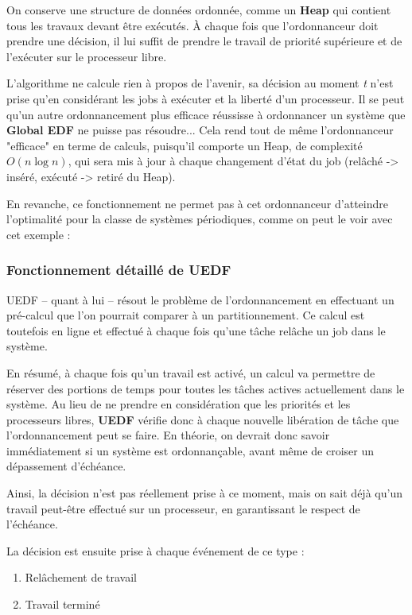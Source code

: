 		
		On conserve une structure de données 
		ordonnée, comme un \textbf{Heap}  qui contient tous les travaux
		devant être exécutés. À chaque fois que l'ordonnanceur doit prendre 
		une décision, il lui suffit de prendre le travail de priorité supérieure et 
		de l'exécuter sur le processeur libre.
		
		L'algorithme ne calcule rien à propos de l'avenir, sa décision au moment \textit{t}
		n'est prise qu'en considérant les jobs à exécuter et la liberté d'un 
		processeur. Il se peut qu'un autre ordonnancement plus efficace 
		réussisse à ordonnancer un système que \textbf{Global EDF} ne puisse pas résoudre...
		Cela rend tout de même l'ordonnanceur "efficace" en terme de calculs, 
		puisqu'il comporte un Heap, de complexité $O(n\log n)$, qui sera mis à jour 
		à chaque changement d'état du job (relâché -> inséré, 
		exécuté -> retiré du Heap).
		
		En revanche, ce fonctionnement ne permet pas à cet ordonnanceur d'atteindre 
		l'optimalité pour la classe de systèmes périodiques, comme on peut le voir 
		avec cet exemple :

		\subsubsection{Fonctionnement détaillé de UEDF}
		UEDF -- quant à lui -- résout le problème de l'ordonnancement en effectuant un pré-calcul 
		que l'on pourrait comparer à un partitionnement. Ce calcul est toutefois en ligne et 
		effectué à chaque fois qu'une tâche relâche un job dans le système.
		
		En résumé, à chaque fois qu'un travail est activé, un calcul va permettre 
		de réserver des portions de temps pour toutes les tâches actives 
		actuellement dans le système. Au lieu de ne prendre en considération que 
		les priorités et les processeurs libres, \textbf{UEDF }vérifie donc à 
		chaque nouvelle libération de tâche que l'ordonnancement peut se faire. 
		En théorie, on devrait donc savoir immédiatement si un système est ordonnançable, 
		avant même de croiser un dépassement d'échéance. 
		
		Ainsi, la décision n'est pas réellement prise à ce moment, 
		mais on sait déjà qu'un travail peut-être effectué sur un 
		processeur, en garantissant le respect de l'échéance.
		
		La décision est ensuite prise à chaque événement de ce type :
		\begin{enumerate}
			\item Relâchement de travail
			\item Travail terminé
		\end{enumerate}

